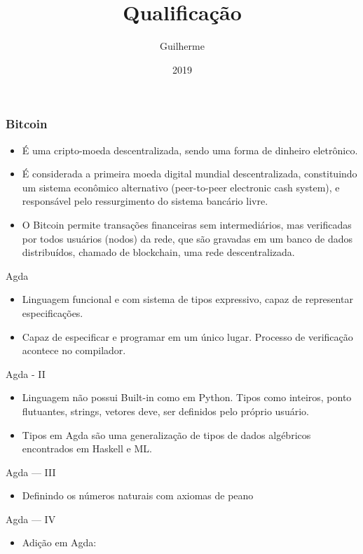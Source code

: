 \documentclass{beamer}
\title{Qualificação}
\author{Guilherme}
\institute{FGV}
\date{2019}
\begin{document}
 
\frame{\titlepage}
 
\begin{frame}
\frametitle{Bitcoin}
\begin{itemize}
    \item É uma cripto-moeda descentralizada, sendo uma forma de dinheiro eletrônico.
    \item É considerada a primeira moeda digital mundial descentralizada, constituindo um sistema econômico alternativo (peer-to-peer electronic cash system), e responsável pelo ressurgimento do sistema bancário livre.
    \item O Bitcoin permite transações financeiras sem intermediários, mas verificadas por todos usuários (nodos) da rede, que são gravadas em um banco de dados distribuídos, chamado de blockchain, uma rede descentralizada.
\end{itemize}
\end{frame}
 
 \begin{frame}{Agda}
 \begin{itemize}
     \item Linguagem funcional e com sistema de tipos expressivo, capaz de representar especificações.
     \item Capaz de especificar e programar em um único lugar. Processo de verificação acontece no compilador.
 \end{itemize}
 \end{frame}
 
 \begin{frame}{Agda - II}
 \begin{itemize}
     \item Linguagem não possui Built-in como em Python. Tipos como inteiros, ponto flutuantes, strings, vetores deve, ser definidos pelo próprio usuário.
     \item Tipos em Agda são uma generalização de tipos de dados algébricos encontrados em Haskell e ML.
 \end{itemize}
 \end{frame}
 
 \begin{frame}{Agda --- III}
\begin{itemize}
	\item Definindo os números naturais com axiomas de peano
 \end{itemize}
\end{frame}

       \begin{frame}{Agda --- IV}
         \begin{itemize}
           \item Adição em Agda:
         \end{itemize}
\end{frame}
\end{document}

